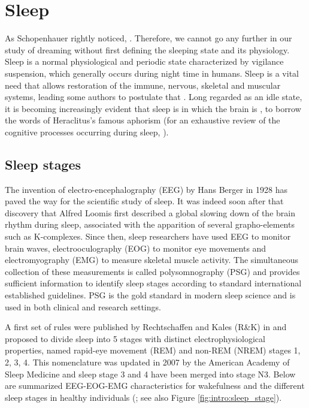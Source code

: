 \section{Sleep}
\label{sec:dream-research:sleep}

As Schopenhauer rightly noticed, . Therefore, we cannot go any further in our study of dreaming without first defining the sleeping state and its physiology. Sleep is a normal physiological and periodic state characterized by vigilance suspension, which generally occurs during night time in humans. Sleep is a vital need that allows restoration of the immune, nervous, skeletal and muscular systems, leading some authors to postulate that  \citep{tononi_sleep_2014}. Long regarded as an idle state, it is becoming increasingly evident that sleep is  \citep{hirshkowitz_normal_2004} in which the brain is , to borrow the words of Heraclitus’s famous aphorism (for an exhaustive review of the cognitive processes occurring during sleep, \citealt[see][]{andrillon_sleeping_2016}).

\subsection{Sleep stages}
\label{sec:dream-research:sleep:stages}

The invention of electro-encephalography (EEG) by Hans Berger in 1928 has paved the way for the scientific study of sleep. It was indeed soon after that discovery that Alfred Loomis first described a global slowing down of the brain rhythm during sleep, associated with the apparition of several grapho-elements such as K-complexes. Since then, sleep researchers have used EEG to monitor brain waves, electrooculography (EOG) to monitor eye movements and electromyography (EMG) to measure skeletal muscle activity. The simultaneous collection of these measurements is called polysomnography (PSG) and provides sufficient information to identify sleep stages according to standard international established guidelines. PSG is the gold standard in modern sleep science and is used in both clinical and research settings.

A first set of rules were published by Rechtschaffen and Kales (R\&K) in \citeyear{kales_manual_1968} and proposed to divide sleep into 5 stages with distinct electrophysiological properties, named rapid-eye movement (REM) and non-REM (NREM) stages 1, 2, 3, 4. This nomenclature was updated in 2007 by the American Academy of Sleep Medicine \citep{iber_aasm_2007} and sleep stage 3 and 4 have been merged into stage N3. Below are summarized EEG-EOG-EMG characteristics for wakefulness and the different sleep stages in healthy individuals (\citealp{hirshkowitz_normal_2004}; see also Figure \ref{fig:intro:sleep_stage}).

